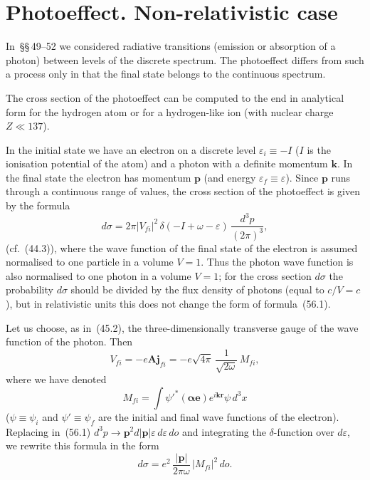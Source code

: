 \section{Photoeffect. Non-relativistic case}

In~\S\S\,49--52 we considered radiative transitions (emission or absorption of a photon) between levels of the discrete spectrum. The photoeffect differs from such a process only in that the final state belongs to the continuous spectrum.

The cross section of the photoeffect can be computed to the end in analytical form for the hydrogen atom or for a hydrogen-like ion (with nuclear charge $Z \ll 137$).

In the initial state we have an electron on a discrete level $\varepsilon_i \equiv -I$ ($I$ is the ionisation potential of the atom) and a photon with a definite momentum $\mathbf{k}$. In the final state the electron has momentum $\mathbf{p}$ (and energy $\varepsilon_f \equiv \varepsilon$). Since $\mathbf{p}$ runs through a continuous range of values, the cross section of the photoeffect is given by the formula
\begin{equation}
d\sigma = 2\pi|V_{fi}|^2\,\delta(-I + \omega - \varepsilon)\,\frac{d^3p}{(2\pi)^3},
\tag{56.1}
\end{equation}
(cf.~(44.3)), where the wave function of the final state of the electron is assumed normalised to one particle in a volume $V = 1$. Thus the photon wave function is also normalised to one photon in a volume $V = 1$; for the cross section $d\sigma$ the probability $d\sigma$ should be divided by the flux density of photons (equal to $c/V = c$), but in relativistic units this does not change the form of formula~(56.1).

Let us choose, as in~(45.2), the three-dimensionally transverse gauge of the wave function of the photon. Then
\[
V_{fi} = -e\mathbf{A}\mathbf{j}_{fi} = -e\sqrt{4\pi}\,\frac{1}{\sqrt{2\omega}}\,M_{fi},
\]
where we have denoted
\begin{equation}
M_{fi} = \int\psi'^*(\boldsymbol{\alpha}\mathbf{e})e^{i\mathbf{k}\mathbf{r}}\psi\,d^3x
\tag{56.2}
\end{equation}
($\psi \equiv \psi_i$ and $\psi' \equiv \psi_f$ are the initial and final wave functions of the electron). Replacing in~(56.1) $d^3p \to \mathbf{p}^2 d|\mathbf{p}|\varepsilon\,d\varepsilon\,do$ and integrating the $\delta$-function over $d\varepsilon$, we rewrite this formula in the form
\begin{equation}
d\sigma = e^2\,\frac{|\mathbf{p}|}{2\pi\omega}\,|M_{fi}|^2\,do.
\tag{56.3}
\end{equation}

